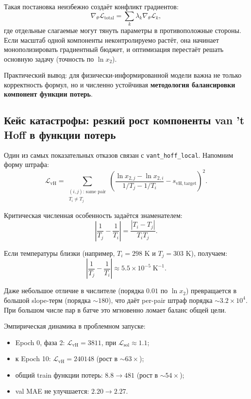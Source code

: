 \documentclass[11pt]{article}
\begin{document}
Такая постановка неизбежно создаёт конфликт градиентов:
\begin{equation*}
\nabla_\theta \mathcal{L}_{\mathrm{total}} = \sum_k \lambda_k \nabla_\theta \mathcal{L}_k,
\end{equation*}
где отдельные слагаемые могут тянуть параметры в противоположные стороны. Если масштаб одной компоненты неконтролируемо растёт, она начинает монополизировать градиентный бюджет, и оптимизация перестаёт решать основную задачу (точность по $\ln x_2$).

Практический вывод: для физически-информированной модели важна не только корректность формул, но и численно устойчивая \textbf{методология балансировки компонент функции потерь}.

\subsection{Кейс катастрофы: резкий рост компоненты van 't Hoff в функции потерь}

Один из самых показательных отказов связан с \texttt{vant\_hoff\_local}. Напомним форму штрафа:
\begin{equation*}
\mathcal{L}_{\text{vH}} = \sum_{\substack{(i,j):\,\text{same pair}\\T_i \neq T_j}}
\left(\frac{\ln x_{2,j} - \ln x_{2,i}}{1/T_j - 1/T_i} - s_{\mathrm{vH,target}}\right)^2.
\end{equation*}

Критическая численная особенность задаётся знаменателем:
\begin{equation*}
\left|\frac{1}{T_j} - \frac{1}{T_i}\right| = \frac{|T_i - T_j|}{T_i T_j}.
\end{equation*}

Если температуры близки (например, $T_i=298$ K и $T_j=303$ K), получаем:
\begin{equation*}
\left|\frac{1}{T_j} - \frac{1}{T_i}\right| \approx 5.5\times 10^{-5}\;\mathrm{K}^{-1}.
\end{equation*}

Даже небольшое отличие в числителе (порядка $0.01$ по $\ln x_2$) превращается в большой slope-терм (порядка $\sim 180$), что даёт per-pair штраф порядка $\sim 3.2\times 10^4$. При большом числе пар в батче это мгновенно ломает баланс общей цели.

Эмпирическая динамика в проблемном запуске:
\begin{itemize}
  \item Epoch 0, фаза 2: $\mathcal{L}_{\text{vH}}=3811$, при $\mathcal{L}_{\mathrm{sol}}\approx 1.1$;
  \item к Epoch 10: $\mathcal{L}_{\text{vH}}=240148$ (рост в $\sim 63\times$);
  \item общий train функции потерь: $8.8 \rightarrow 481$ (рост в $\sim 54\times$);
  \item val MAE не улучшается: $2.20 \rightarrow 2.27$.
\end{itemize}
\end{document}
